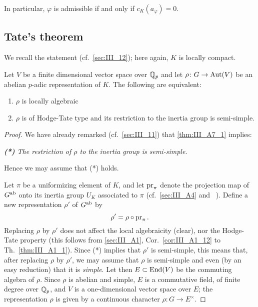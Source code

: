 \begin{subappendices}
\begin{enumerate}
	In particular, $\varphi$ is admissible if and only if $c_K(a_\varphi) =
	0$.
\end{enumerate}

\subsection{Tate's theorem}
\label{sec:III_A7}
We recall the statement (cf.\ \ref{sec:III_12}); here again, $K$ is locally
compact.

\begin{thm}
	Let $V$ be a finite dimensional vector space over $\mathbb{Q}_p$ and let $\rho
	\colon G \to \operatorname{Aut}(V)$ be an abelian $p$-adic representation of $K$.
	The following are equivalent:
	\begin{enumerate}[(1)]
	\item\label{thm:III_A7_1} $\rho$ is locally algebraic
	\item\label{thm:III_A7_2} $\rho$ is of Hodge-Tate type and its
		restriction to the inertia group is semi-simple.
	\end{enumerate}
\end{thm}
\begin{proof}
	We have already remarked (cf.\ \ref{sec:III_11}) that
	\ref{thm:III_A7_1} implies:
	\begin{displayquote}
		\emph{\textbf{(*)} The restriction of $\rho$ to the inertia
		group is semi-simple.}
	\end{displayquote}
	Hence we may assume that (*) holds.

	Let $\pi$ be a uniformizing element of $K$, and let $\operatorname{pr}_\pi$ denote
	the projection map of $G^{\mathrm{ab}}$ onto its inertia group $U_K$ associated
	to $\pi$ (cf.\ \ref{sec:III_A4} and \citeauthor{6}~\cite[144-145]{6}).
	Define a new representation $\rho'$ of $G^{\mathrm{ab}}$ by
	\[
		\rho' = \rho \circ \operatorname{pr}_\pi.
	\]
	Replacing $\rho$ by $\rho'$ does not affect the local algebraicity
	(clear), nor the Hodge-Tate property (this follows from
	\ref{sec:III_A1}, Cor.~\ref{cor:III_A1_12} to Th.~\ref{thm:III_A1_1}).
	Since (*) implies that $\rho'$ is semi-simple, this means that, after
	\dpage
	replacing $\rho$ by $\rho'$, we may assume that $\rho$ is semi-simple
	and even (by an easy reduction) that it is \emph{simple}. Let then $E
	\subset \operatorname{End}(V)$ be the commuting algebra of $\rho$. Since $\rho$ is
	abelian and simple, $E$ is a commutative field, of finite degree over
	$\mathbb{Q}_p$, and $V$ is a one-dimensional vector space over $E$; the
	representation $\rho$ is given by a continuous character $\rho \colon G
	\to E^\times$.


\end{proof}
\end{subappendices}
